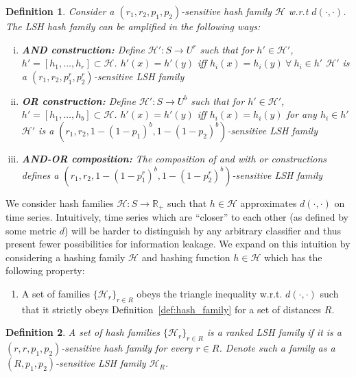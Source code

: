 \documentclass[a4paper]{article}
\newtheorem{definition}{Definition}
\begin{document}
\begin{definition}\label{def:lsh_amplification}
    Consider a $(r_1, r_2, p_1, p_2)$-sensitive hash family $\mathcal{H}$ w.r.t $d(\cdot,\cdot)$. The LSH hash family can be amplified in the following ways:
    \begin{enumerate}[(i)]
        \item \textbf{AND construction:} Define $\mathcal{H}' : S \rightarrow U^r$ such that for $h' \in \mathcal{H}'$, $h' = [h_1, \ldots, h_r] \subset \mathcal{H}$.
            $h'(x) = h'(y)$ iff $h_i(x) = h_i(y) ~\forall~h_i \in h'$
            $\mathcal{H'}$ is a $(r_1, r_2, p_1^r, p_2^r)$-sensitive LSH family
        \item \textbf{OR construction:} Define $\mathcal{H}' : S \rightarrow U^b$ such that for $h' \in \mathcal{H}'$, $h' = [h_1, \ldots, h_b] \subset \mathcal{H}$.
            $h'(x) = h'(y)$ iff $h_i(x) = h_i(y)$ for any $h_i \in h'$
            $\mathcal{H'}$ is a $(r_1, r_2, 1-{(1-p_1)}^b, 1-{(1-p_2)}^b)$-sensitive LSH family
        \item \textbf{AND-OR composition:} The composition of \textnormal{and} with \textnormal{or} constructions defines a $(r_1, r_2, 1-{(1-p_1^r)}^b, 1-{(1-p_2^r)}^b)$-sensitive LSH family
    \end{enumerate}
\end{definition}

We consider hash families $\mathcal{H} : S \rightarrow \mathbb{R}_{+}$ such that $h \in \mathcal{H}$ approximates $d(\cdot,\cdot)$ on time series.
Intuitively, time series which are ``closer'' to each other (as defined by some metric $d$) will be harder to distinguish by any arbitrary classifier and thus present fewer possibilities for information leakage.
We expand on this intuition by considering a hashing family $\mathcal{H}$ and hashing function $h \in \mathcal{H}$ which has the following property:

\begin{enumerate}[*]
    \item\label{itm:hash_def3}
        A set of families ${\{\mathcal{H}_r\}}_{r\in R}$ obeys the triangle inequality w.r.t. $d(\cdot,\cdot)$ such that it strictly obeys Definition~\ref{def:hash_family} for a set of distances $R$.
\end{enumerate}

\begin{definition}\label{defn:ranked_lsh}
    A set of hash families ${\{\mathcal{H}_r\}}_{r\in R}$ is a ranked LSH family if it is a $(r,r,p_1,p_2)$-sensitive hash family for every $r \in R$.
    Denote such a family as a $(R,p_1,p_2)$-sensitive LSH family $\mathcal{H}_R$.
\end{definition}
\end{document}

